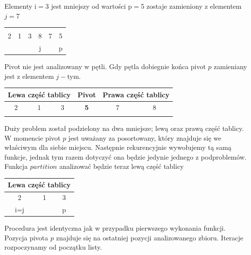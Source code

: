 \documentclass[a4paper,11pt]{report}
\begin{document}
Elementy i$=$3 jest mniejszy od wartości p$=$5 zostaje zamieniony z elementem $j=$7 

\begin{table}[h!]
\Large
\centering
\begin{tabular}{|c|c|c|c|c|c|}
\hline
 &  &  & \cellcolor{black!25} &  &\cellcolor{black!25} \\
2 & 1 & 3 & \cellcolor{black!25}8 & 7 &\cellcolor{black!25} 5 \\ \hdashline
 &   &   & j  &  & p\\ \hline
\end{tabular}

\end{table}

Pivot nie jest analizowany w pętli. Gdy pętla dobiegnie końca pivot $p$ zamieniany jest z elementem $j-$tym.


\begin{table}[h!]
\Large
\centering
\begin{tabular}{|c|c|c|c|c|c|}
\hline
\multicolumn{3}{|c|}{Lewa część tablicy} & Pivot & \multicolumn{2}{c|}{Prawa część tablicy} \\ \hline
2 & 1 & 3 & \textbf{5} & 7 & 8 \\ \hdashline
 &  &  &  &  &  \\ \hline
\end{tabular}

\end{table}

Duży problem został podzielony na dwa mniejsze; lewą oraz prawą część tablicy. W momencie pivot $p$ jest uważany za posortowany, który znajduje się we właściwym dla siebie miejscu. Następnie rekurencyjnie wywołujemy tą samą funkcje, jednak tym razem dotyczyć ona będzie jedynie jednego z podproblemów. Funkcja $partition$ analizować będzie teraz lewą część tablicy

\begin{table}[h!]
\Large
\centering
\begin{tabular}{|c|c|c|}
\hline
\multicolumn{3}{|c|}{Lewa część tablicy} \\ \hline
\cellcolor{black!25}2 & 1 & 3 \\ \hdashline
i=j &  & p \\ \hline
\end{tabular}

\end{table}

Procedura jest identyczna jak w przypadku pierwszego wykonania funkcji. Pozycja pivota $p$ znajduje się na ostatniej pozycji analizowanego zbioru. Iteracje rozpoczynamy od początku listy. 
\end{document}
